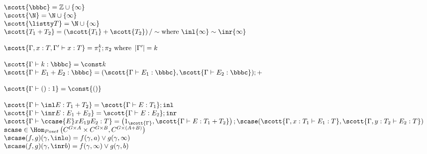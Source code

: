 \begin{small}
\[
\begin{array}{l}
\scott{\bbbc} = \mathbb{Z} \cup \{\infty\} \\
\scott{\N} = \N \cup \{\infty\}\\
\scott{\listty T} = \N \cup \{\infty\}\\
\scott{T_1 + T_2} = \left(\scott{T_1} + \scott{T_2}\right)/\sim \text{where } \inl{\infty} \sim \inr{\infty} \\
\\
\scott{\Gamma,x:T, \Gamma' \vdash x : T} = \pi_1^k ; \pi_2 \text{ where } \left|\Gamma'\right| = k\\
\\
\scott{\Gamma \vdash k : \bbbc} = \const k\\
\scott{\Gamma \vdash E_1 + E_2 : \bbbc} = (\scott{\Gamma \vdash E_1 : \bbbc},\scott{\Gamma \vdash E_2 : \bbbc}) ; +\\
\\
\scott{\Gamma \vdash () : 1} = \const {()}\\
\\

\scott{\Gamma \vdash \inl E : T_1 + T_2} = \scott{\Gamma \vdash E : T_1} ; \texttt{inl}\\

\scott{\Gamma \vdash \inr E : E_1 + E_2} = \scott{\Gamma \vdash E : E_2} ; \texttt{inr}\\
\scott{\Gamma \vdash \ccase {E} x {E_1} y {E_2} : T} = \left(1_{\scott{\Gamma}},\scott{\Gamma \vdash E : T_1 + T_2}\right) ; \scase(\scott{\Gamma,x : T_1 \vdash E_1 : T},\scott{\Gamma, y : T_2 \vdash E_2 : T})\\
\texttt{scase} \in \Hom_{Poset}\left(C^{G \times A}\times C^{G \times B},C^{G\times(A + B)}\right)\\
\scase(f,g)(\gamma,\inl a) = f(\gamma,a) \vee g(\gamma,\infty)\\
\scase(f,g)(\gamma,\inr b) = f(\gamma,\infty) \vee g(\gamma,b)\\
\\



\end{array}\]
\end{small}
